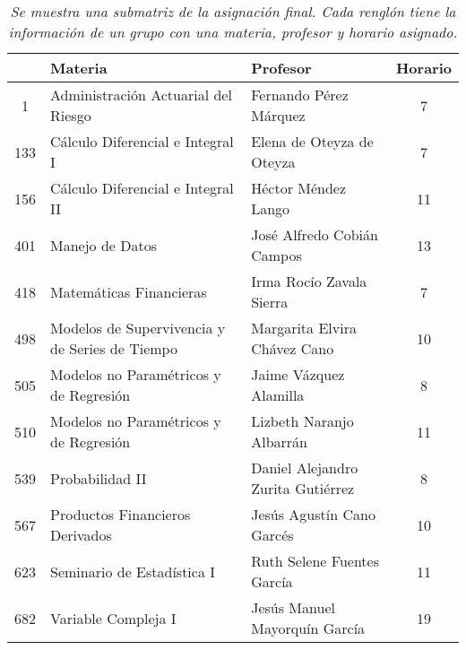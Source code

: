 \begin{table}[H]
\centering
\begin{tabular}{|c|p{7cm}|p{4.7cm}|c|}
\hline
\textbf{ } & \textbf{Materia} & \textbf{Profesor} & \textbf{Horario} \\ \hline
1 & Administración Actuarial del Riesgo & Fernando Pérez Márquez & 7 \\ \hline
  133 & Cálculo Diferencial e Integral I & Elena de Oteyza de Oteyza & 7 \\ \hline
  156 & Cálculo Diferencial e Integral II & Héctor Méndez Lango & 11 \\ \hline
  401 & Manejo de Datos & José Alfredo Cobián Campos & 13 \\ \hline
  418 & Matemáticas Financieras & Irma Rocío Zavala Sierra & 7 \\ \hline
  498 & Modelos de Supervivencia y de Series de Tiempo & Margarita Elvira Chávez Cano & 10 \\ \hline
  505 & Modelos no Paramétricos y de Regresión & Jaime Vázquez Alamilla & 8 \\ \hline
  510 & Modelos no Paramétricos y de Regresión & Lizbeth Naranjo Albarrán & 11 \\ \hline
  539 & Probabilidad II & Daniel Alejandro Zurita Gutiérrez & 8 \\ \hline
  567 & Productos Financieros Derivados & Jesús Agustín Cano Garcés & 10 \\ \hline
  623 & Seminario de Estadística I & Ruth Selene Fuentes García & 11 \\ \hline
  682 & Variable Compleja I & Jesús Manuel Mayorquín García & 19 \\ \hline
\end{tabular}
\caption[\textit{Submatriz con asignación final}]{\textit{Se muestra una submatriz de la asignación final. Cada renglón tiene la información de un grupo con una materia, profesor y horario asignado.}}\label{submatAsigFinal}
\end{table}


